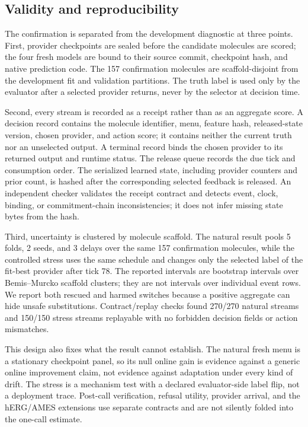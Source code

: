 \documentclass[sigconf,anonymous]{aamas}
\begin{document}
\subsection{Validity and reproducibility}
The confirmation is separated from the development diagnostic at three points. First, provider checkpoints are sealed before the candidate molecules are scored; the four fresh models are bound to their source commit, checkpoint hash, and native prediction code. The 157 confirmation molecules are scaffold-disjoint from the development fit and validation partitions. The truth label is used only by the evaluator after a selected provider returns, never by the selector at decision time.

Second, every stream is recorded as a receipt rather than as an aggregate score. A decision record contains the molecule identifier, menu, feature hash, released-state version, chosen provider, and action score; it contains neither the current truth nor an unselected output. A terminal record binds the chosen provider to its returned output and runtime status. The release queue records the due tick and consumption order. The serialized learned state, including provider counters and prior count, is hashed after the corresponding selected feedback is released. An independent checker validates the receipt contract and detects event, clock, binding, or commitment-chain inconsistencies; it does not infer missing state bytes from the hash.

Third, uncertainty is clustered by molecule scaffold. The natural result pools 5 folds, 2 seeds, and 3 delays over the same 157 confirmation molecules, while the controlled stress uses the same schedule and changes only the selected label of the fit-best provider after tick 78. The reported intervals are bootstrap intervals over Bemis--Murcko scaffold clusters; they are not intervals over individual event rows. We report both rescued and harmed switches because a positive aggregate can hide unsafe substitutions. Contract/replay checks found 270/270 natural streams and 150/150 stress streams replayable with no forbidden decision fields or action mismatches.

This design also fixes what the result cannot establish. The natural fresh menu is a stationary checkpoint panel, so its null online gain is evidence against a generic online improvement claim, not evidence against adaptation under every kind of drift. The stress is a mechanism test with a declared evaluator-side label flip, not a deployment trace. Post-call verification, refusal utility, provider arrival, and the hERG/AMES extensions use separate contracts and are not silently folded into the one-call estimate.
\end{document}
